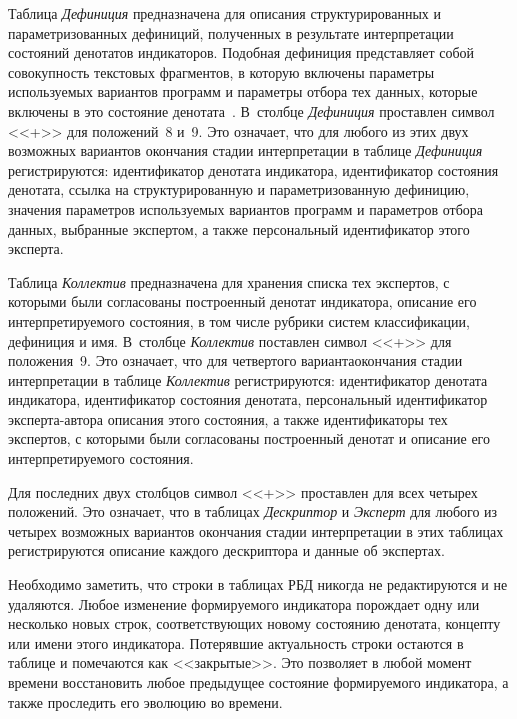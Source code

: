 \begin{multicols}{2}
   Таблица \textit{Дефиниция} предназначена для описания структурированных и 
параметризованных дефиниций, полученных в результате интерпретации состояний 
денотатов индикаторов. Подобная дефиниция представляет собой совокупность текстовых 
фрагментов, в которую включены параметры используемых вариантов программ и 
параметры отбора тех данных, которые включены в это состояние денотата~\cite{23-zat}. 
В~столбце \textit{Дефиниция} проставлен символ <<+>> для положений~8 и~9. Это 
означает, что для любого из этих двух возможных вариантов окончания стадии 
интерпретации в таблице \textit{Дефиниция} регистрируются: идентификатор денотата 
индикатора, идентификатор состояния денотата, ссылка на структурированную и 
параметризованную дефиницию, значения параметров ис\-поль\-зу\-емых вариантов программ и 
параметров отбора данных, выбранные экспертом, а также персональный идентификатор 
этого эксперта.
   
   Таблица \textit{Коллектив} предназначена для хранения списка тех экспертов, с 
которыми были согласованы построенный денотат индикатора, описание его 
интерпретируемого состояния, в том числе рубрики систем классификации, дефиниция и 
имя. В~столбце \textit{Коллектив} поставлен символ <<+>> для положения~9. Это означает, 
что для четвертого варианта\linebreak окончания стадии интерпретации в таблице \textit{Коллектив} 
регистрируются: идентификатор денотата индикатора, идентификатор состояния денотата,\linebreak 
персональный идентификатор эксперта-автора описания этого состояния, а также 
идентификаторы тех экспертов, с которыми были согласованы построенный денотат и 
описание его интерпретируемого состояния.
   
   Для последних двух столбцов символ <<+>> проставлен для всех четырех положений. 
Это означает, что в таблицах \textit{Дескриптор} и \textit{Эксперт} для любого из 
четырех возможных вариантов окончания стадии интерпретации в этих таблицах 
регистрируются описание каждого дескриптора и данные об экспертах.
   
   Необходимо заметить, что строки в таблицах РБД никогда не редактируются и не 
удаляются. Любое изменение формируемого индикатора по\-рож\-да\-ет одну или несколько 
новых строк, соответствующих новому состоянию денотата, концепту или имени этого 
индикатора. Потерявшие актуальность строки остаются в таблице и помечаются как 
<<закрытые>>. Это позволяет в любой момент времени восстановить любое предыдущее 
состояние формируемого индикатора, а также проследить его эволюцию во времени.
   

\end{multicols}
